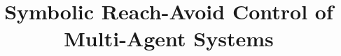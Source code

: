 \documentclass[sigconf,review]{acmart}
\title{Symbolic Reach-Avoid Control of Multi-Agent Systems}
\begin{document}
\begin{abstract}
	
\end{abstract}



\maketitle




	


%






% 
%
% 
\end{document}
